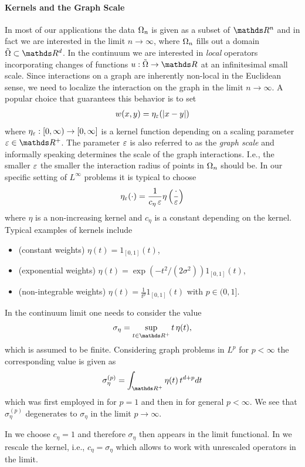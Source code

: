 \paragraph{Kernels and the Graph Scale} 
In most of our applications the data $\Omega_n$ is given as a subset of $\R^n$ and in fact we are interested in the limit $n\to\infty$, where $\Omega_n$ fills out a domain $\tilde\domain\subset\R^d$. In the continuum we are interested in \emph{local} operators incorporating changes of functions $u:\tilde\domain\to\R$ at an infinitesimal small scale. Since interactions on a graph are inherently non-local in the Euclidean sense, we need to localize the interaction on the graph in the limit $n\to\infty$. A popular choice that guarantees this behavior is to set
%
\begin{align*}
w(x,y) = \eta_{\varepsilon}(\left|x-y\right|)
\end{align*}
%
where $\eta_\varepsilon:[0,\infty)\to [0,\infty]$ is a kernel function depending on a scaling parameter $\gscale\in\R^+$. The parameter $\varepsilon$ is also referred to as the \emph{graph scale} and informally speaking determines the scale of the graph interactions. I.e., the smaller $\varepsilon$ the smaller the interaction radius of points in $\Omega_n$ should be. In our specific setting of $L^\infty$ problems it is typical to choose
%
\begin{align*}
\eta_\varepsilon(\cdot) = \frac{1}{c_\eta\, \varepsilon} \eta\left(\frac{\cdot}{\varepsilon}\right)
\end{align*}
%
where $\eta$ is a non-increasing kernel and $c_\eta$ is a constant depending on the kernel. Typical examples of kernels include
%
\begin{itemize}
\item (constant weights) $\eta(t)=1_{[0,1]}(t)$,
\item (exponential weights) $\eta(t)=\exp(-t^2/(2\sigma^2))1_{[0,1]}(t)$,
\item (non-integrable weights) $\eta(t)=\frac{1}{t^p}1_{[0,1]}(t)$ with $p\in(0,1]$.
\end{itemize}
%
%
\begin{remark}{}{}
In the continuum limit one needs to consider the value 
%
\begin{align*}
\sigma_\eta = \sup_{t\in\R^+} t\, \eta(t),
\end{align*}
%
which is assumed to be finite. Considering graph problems in $L^p$ for $p<\infty$
the corresponding value is given as
%
\begin{align}\label{eq:kernelconst}
\sigma_\eta^{(p)} = \int_{\R^+} \eta(t)\, t^{d+p} dt
\end{align}
%
which was first employed in \cite{GarcSlep15} for $p=1$ and then in \cite{slepcev2019analysis} for general $p<\infty$. We see that $\sigma_\eta^{(p)}$ degenerates to $\sigma_\eta$ in the limit $p\to\infty$.

In \cite{roith2022continuum} we choose $c_\eta=1$ and therefore $\sigma_\eta$ then appears in the limit functional. In \cite{bungert2021uniform} we rescale the kernel, i.e., $c_\eta = \sigma_\eta$ which allows to work with unrescaled operators in the limit. 
\end{remark}
